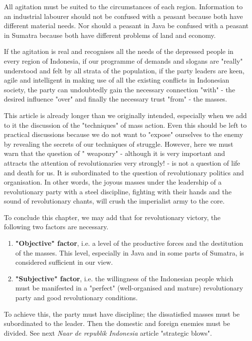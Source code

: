 All agitation must be suited to the circumstances of each region. Information to an industrial labourer should not be confused with a peasant 
because both have different material needs. Nor should a peasant in Java be confused with a peasant in Sumatra because both have different 
problems of land and economy.\nline

If the agitation is real and recognises all the needs of the depressed people in every region of Indonesia, 
if our programme of demands and slogans are "really" understood and felt by all strata of the population, if the party leaders are keen, 
agile and intelligent in making use of all the existing conflicts in Indonesian society, 
the party can undoubtedly gain the necessary connection "with" - the desired influence "over" and finally the necessary trust "from" - the masses.\nline

This article is already longer than we originally intended, especially when we add to it the discussion of the "techniques" of mass action. 
Even this should be left to practical discussions because we do not want to "expose" ourselves to the enemy by revealing the secrets of our 
techniques of struggle. However, here we must warn that the question of " weaponry" - although it is very important and attracts 
the attention of revolutionaries very strongly! - is not a question of life and death for us. It is subordinated to the question 
of revolutionary politics and organisation. In other words, the joyous masses under the leadership of a revolutionary party with a 
steel discipline, fighting with their hands and the sound of revolutionary chants, will crush the imperialist army to the core.\nline

To conclude this chapter, we may add that for revolutionary victory, the following two factors are necessary.\nline

\begin{enumerate}
    \item \textbf{"Objective" factor}, i.e. a level of the productive forces and the destitution of the masses. This level, especially in Java and in some parts of Sumatra, is considered sufficient in our view.
    \item \textbf{"Subjective" factor}, i.e. the willingness of the Indonesian people which must be manifested in a "perfect" (well-organised and mature) revolutionary party and good revolutionary conditions.
\end{enumerate}

To achieve this, the party must have discipline; the dissatisfied masses must be subordinated to the leader. 
Then the domestic and foreign enemies must be divided. See next \emph{Naar de republik Indonesia} article "strategic blows".\nline

